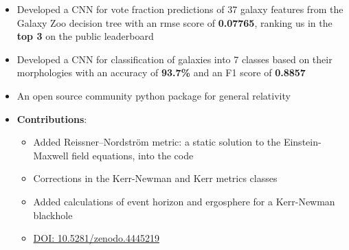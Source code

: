 \documentclass[10pt,a4paper,ragged2e,withhyper]{altacv}
\begin{document}
\begin{paracol}{2}
\begin{itemize}
    \item Developed a CNN for vote fraction predictions of 37 galaxy features from the Galaxy Zoo decision tree with an rmse score of \textbf{0.07765}, ranking us in the \textbf{top 3} on the public leaderboard
    \item Developed a CNN for classification of galaxies into 7 classes based on their morphologies with an accuracy of \textbf{93.7\%} and an F1 score of \textbf{0.8857}
\end{itemize}
\begin{itemize}
    \item An open source community python package for general relativity
    \item \textbf{Contributions}:
    \begin{itemize}
        \item Added Reissner–Nordström metric: a static solution to the Einstein-Maxwell field equations, into the code %
        \item Corrections in the Kerr-Newman and Kerr metrics classes
        \item Added calculations of event horizon and ergosphere for a Kerr-Newman blackhole %
        \item \href{https://doi.org/10.5281/zenodo.4445219
}{DOI: 10.5281/zenodo.4445219}
    \end{itemize}
\end{itemize}
\nocite{*}
\printbibliography[heading=pubtype,title={\printinfo{\faFile*[regular]}{Journal Articles}}, type=misc]
\end{paracol}
\end{document}
